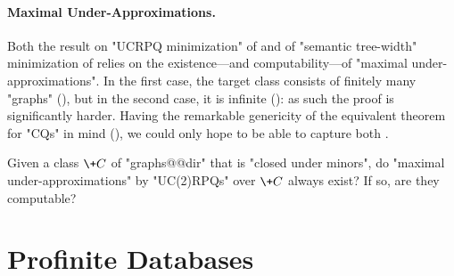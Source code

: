 \paragraph*{Maximal Under-Approximations.}
Both the result on "UCRPQ minimization" of 
and of "semantic tree-width" minimization of  
relies on the existence---and computability---of "maximal under-approximations".
In the first case, the target class consists of finitely many "graphs" (), but in the second case,
it is infinite (): as such the proof is significantly harder.
Having the remarkable genericity of the equivalent theorem for "CQs" in mind
(), we could only hope to be able to capture 
both .

\begin{question}
	Given a class $\+C$ of "graphs@@dir" that is "closed under minors",
	do "maximal under-approximations" by "UC(2)RPQs" over $\+C$ always exist?
	If so, are they computable?
\end{question}

\section{Profinite Databases}

